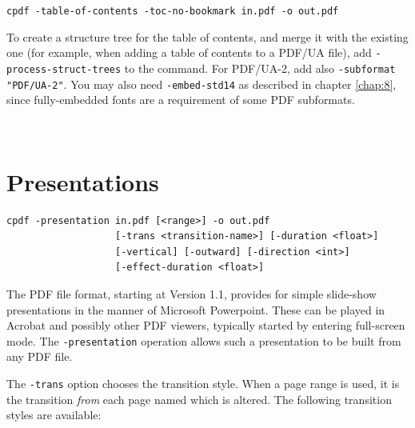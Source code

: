 \documentclass{book}
\begin{document}
  \begin{framed}
   \noindent\small\verb!cpdf -table-of-contents -toc-no-bookmark in.pdf -o out.pdf!
  \end{framed}

\noindent To create a structure tree for the table of contents, and merge it with the existing one (for example, when adding a table of contents to a PDF/UA file), add \texttt{-process-struct-trees} to the command. For PDF/UA-2, add also \texttt{-subformat "PDF/UA-2"}. You may also need \texttt{-embed-std14} as described in chapter \ref{chap:8}, since fully-embedded fonts are a requirement of some PDF subformats.

\ \ \

\clearpage\pagestyle{empty}

\chapter{Presentations}\label{chap:7}\pagestyle{fancy}

  \begin{framed}
  \small\noindent\begin{verbatim}
cpdf -presentation in.pdf [<range>] -o out.pdf
                   [-trans <transition-name>] [-duration <float>]
                   [-vertical] [-outward] [-direction <int>]
                   [-effect-duration <float>]\end{verbatim}
\end{framed}

The PDF file format, starting at Version 1.1, provides for simple slide-show
presentations in the manner of Microsoft Powerpoint. These can be played in
Acrobat and possibly other PDF viewers, typically started by entering
full-screen mode. The \texttt{-presentation} operation allows such a
presentation to be built from any PDF file.

The \texttt{-trans} option chooses the transition style. When a page range is
used, it is the transition \textit{from} each page named which is altered. The
following transition styles are available:
\end{document}
